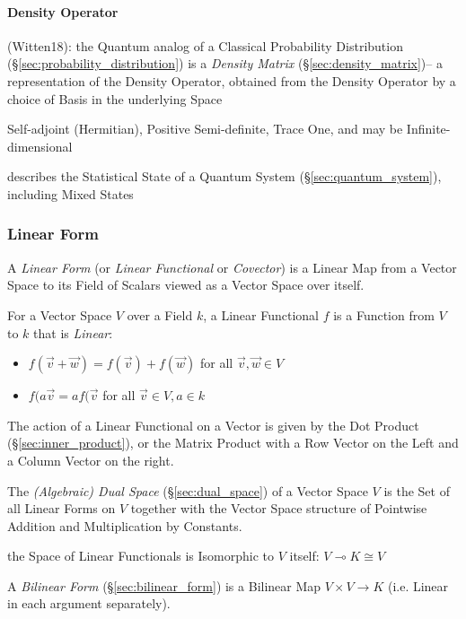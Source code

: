 \paragraph{Density Operator}\label{sec:density_operator}\hfill

(Witten18): the Quantum analog of a Classical Probability Distribution
(\S\ref{sec:probability_distribution}) is a \emph{Density Matrix}
(\S\ref{sec:density_matrix})-- a representation of the Density Operator,
obtained from the Density Operator by a choice of Basis in the underlying Space

Self-adjoint (Hermitian), Positive Semi-definite, Trace One, and may be
Infinite-dimensional

describes the Statistical State of a Quantum System
(\S\ref{sec:quantum_system}), including Mixed States



\subsubsection{Linear Form}\label{sec:linear_form}

A \emph{Linear Form} (or \emph{Linear Functional} or \emph{Covector}) is a
Linear Map from a Vector Space to its Field of Scalars viewed as a Vector Space
over itself.

For a Vector Space $V$ over a Field $k$, a Linear Functional $f$ is a Function
from $V$ to $k$ that is \emph{Linear}:
\begin{itemize}
\item $f(\vec{v} + \vec{w}) = f(\vec{v}) + f(\vec{w})$ for all $\vec{v},
  \vec{w} \in V$
\item $f(a\vec{v} = af(\vec{v}$ for all $\vec{v} \in V, a \in k$
\end{itemize}

The action of a Linear Functional on a Vector is given by the Dot Product
(\S\ref{sec:inner_product}), or the Matrix Product with a Row Vector on the
Left and a Column Vector on the right.

The \emph{(Algebraic) Dual Space} (\S\ref{sec:dual_space}) of a Vector Space
$V$ is the Set of all Linear Forms on $V$ together with the Vector Space
structure of Pointwise Addition and Multiplication by Constants.

the Space of Linear Functionals is Isomorphic to $V$ itself:
$V \multimap K \cong V$

A \emph{Bilinear Form} (\S\ref{sec:bilinear_form}) is a Bilinear Map $V \times
V \rightarrow K$ (i.e. Linear in each argument separately).

